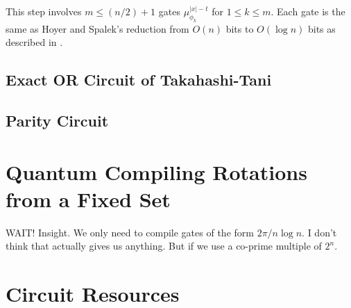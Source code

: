 This step involves $m \le (n/2)+1$ gates $\mu^{|x|-t}_{\phi_k}$ for
$1 \le k \le m$. Each gate is the same as Hoyer and Spalek's reduction from
$O(n)$ bits to $O(\log n)$ bits as described in \cite{Hoyer2002}.

\subsection{Exact OR Circuit of Takahashi-Tani}
\label{subsec:or-exact}



\subsection{Parity Circuit}
\label{subsec:parity}


\section{Quantum Compiling Rotations from a Fixed Set}

WAIT! Insight. We only need to compile gates of the form
$2\pi / n\log n$. I don't think that actually gives us anything.
But if we use a co-prime multiple of $2^n$.

\section{Circuit Resources}